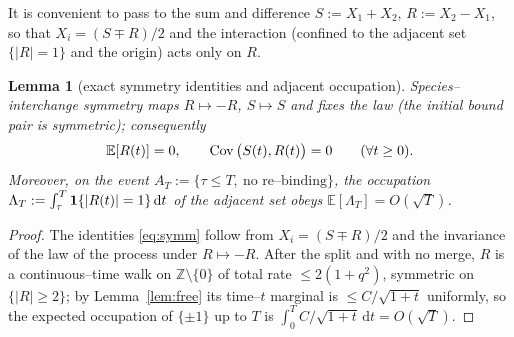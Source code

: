 \documentclass[11pt]{article}
\theoremstyle{plain}
\newtheorem{lemma}[theorem]{Lemma}
\theoremstyle{definition}
\theoremstyle{remark}
\newcommand{\Z}{\mathbb{Z}}\newcommand{\R}{\mathbb{R}}\newcommand{\N}{\mathbb{N}}
\newcommand{\E}{\mathbb{E}}\newcommand{\PP}{\mathbb{P}}\newcommand{\dd}{\,\mathrm{d}}
\begin{document}
It is convenient to pass to the sum and difference $S:=X_1+X_2$, $R:=X_2-X_1$, so that
$X_i=(S\mp R)/2$ and the interaction (confined to the adjacent set $\{|R|=1\}$ and the
origin) acts only on $R$.

\begin{lemma}[exact symmetry identities and adjacent occupation]\label{lem:occ}
Species--interchange symmetry maps $R\mapsto-R$, $S\mapsto S$ and fixes the law (the
initial bound pair is symmetric); consequently
\begin{equation}\label{eq:symm}
  \E[R(t)]=0,\qquad \Cov\big(S(t),R(t)\big)=0\qquad(\forall t\ge0).
\end{equation}
Moreover, on the event $A_T:=\{\tau\le T,\ \text{no re--binding}\}$, the occupation
$\Lambda_T:=\int_\tau^T\bone\{|R(t)|=1\}\dd t$ of the adjacent set obeys
$\E[\Lambda_T]=O(\sqrt T)$.
\end{lemma}
\begin{proof}
The identities \eqref{eq:symm} follow from $X_i=(S\mp R)/2$ and the invariance of the
law of the process under $R\mapsto-R$. After the split and with no merge, $R$ is a
continuous--time walk on $\Z\setminus\{0\}$ of total rate $\le2(1+q^2)$, symmetric on
$\{|R|\ge2\}$; by Lemma~\ref{lem:free} its time--$t$ marginal is $\le C/\sqrt{1+t}$
uniformly, so the expected occupation of $\{\pm1\}$ up to $T$ is
$\int_0^T C/\sqrt{1+t}\dd t=O(\sqrt T)$.
\end{proof}
\end{document}
